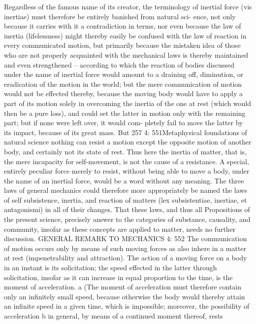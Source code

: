 Regardless of the famous name of its creator, the terminology of inertial
force (vis inertiae) must therefore be entirely banished from natural sci-
ence, not only because it carries with it a contradiction in terms, nor even
because the law of inertia (lifelessness) might thereby easily be confused
with the law of reaction in every communicated motion, but primarily
because the mistaken idea of those who are not properly acquainted with
the mechanical laws is thereby maintained and even strengthened –
according to which the reaction of bodies discussed under the name of
inertial force would amount to a draining off, diminution, or eradication
of the motion in the world; but the mere communication of motion
would not be effected thereby, because the moving body would have to
apply a part of its motion solely in overcoming the inertia of the one at
rest (which would then be a pure loss), and could set the latter in motion
only with the remaining part; but if none were left over, it would com-
pletely fail to move the latter by its impact, because of its great mass. But
257
4: 551Metaphysical foundations of natural science
nothing can resist a motion except the opposite motion of another body,
and certainly not its state of rest. Thus here the inertia of matter, that is,
the mere incapacity for self-movement, is not the cause of a resistance.
A special, entirely peculiar force merely to resist, without being able to
move a body, under the name of an inertial force, would be a word without
any meaning. The three laws of general mechanics could therefore more
appropriately be named the laws of self subsistence, inertia, and reaction of
matters (lex subsistentiae, inertiae, et antagonismi) in all of their changes. That
these laws, and thus all Propositions of the present science, precisely
answer to the categories of substance, causality, and community, insofar as
these concepts are applied to matter, needs no further discussion.
GENERAL REMARK TO MECHANICS
4: 552
The communication of motion occurs only by means of such moving
forces as also inhere in a matter at rest (impenetrability and attraction).
The action of a moving force on a body in an instant is its solicitation;
the speed effected in the latter through solicitation, insofar as it can
increase in equal proportion to the time, is the moment of acceleration. a
(The moment of acceleration must therefore contain only an inﬁnitely
small speed, because otherwise the body would thereby attain an inﬁnite
speed in a given time, which is impossible; moreover, the possibility of
acceleration b in general, by means of a continued moment thereof, rests
